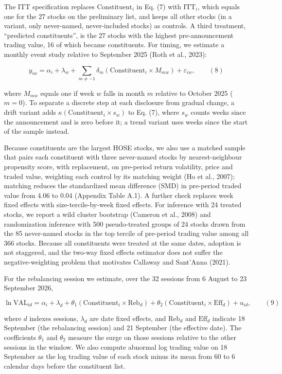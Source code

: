 \documentclass[review,authoryear,12pt]{elsarticle}
\begin{document}
The ITT specification replaces \(\mathrm{Constituent}_i\) in Eq. (7)
with \(\mathrm{ITT}_i\), which equals one for the 27 stocks on the
preliminary list, and keeps all other stocks (in a variant, only
never-named, never-included stocks) as controls. A third treatment,
``predicted constituents'', is the 27 stocks with the highest
pre-announcement trading value, 16 of which became constituents. For
timing, we estimate a monthly event study relative to September 2025
(Roth et al., 2023):

\[y_{iw} = \alpha_i + \lambda_w + \sum_{m \neq -1}\delta_m\left(\mathrm{Constituent}_i \times M_{mw}\right) + \varepsilon_{iw}, \qquad (8)\]

where \(M_{mw}\) equals one if week \(w\) falls in month \(m\) relative
to October 2025 (\(m = 0\)). To separate a discrete step at each
disclosure from gradual change, a drift variant adds
\(\kappa\left(\mathrm{Constituent}_i \times s_w\right)\) to Eq. (7),
where \(s_w\) counts weeks since the announcement and is zero before it;
a trend variant uses weeks since the start of the sample instead.

Because constituents are the largest HOSE stocks, we also use a matched
sample that pairs each constituent with three never-named stocks by
nearest-neighbour propensity score, with replacement, on pre-period
return volatility, price and traded value, weighting each control by its
matching weight (Ho et al., 2007); matching reduces the standardized
mean difference (SMD) in pre-period traded value from 4.06 to 0.04
(Appendix Table A.1). A further check replaces week fixed effects with
size-tercile-by-week fixed effects. For inference with 24 treated
stocks, we report a wild cluster bootstrap (Cameron et al., 2008) and
randomization inference with 500 pseudo-treated groups of 24 stocks
drawn from the 85 never-named stocks in the top tercile of pre-period
trading value among all 366 stocks. Because all constituents were
treated at the same dates, adoption is not staggered, and the two-way
fixed effects estimator does not suffer the negative-weighting problem
that motivates Callaway and Sant'Anna (2021).

For the rebalancing session we estimate, over the 32 sessions from 6
August to 23 September 2026,

\[\ln\mathrm{VAL}_{id} = \alpha_i + \lambda_d + \theta_1\left(\mathrm{Constituent}_i \times \mathrm{Reb}_d\right) + \theta_2\left(\mathrm{Constituent}_i \times \mathrm{Eff}_d\right) + u_{id}, \qquad (9)\]

where \(d\) indexes sessions, \(\lambda_d\) are date fixed effects, and
\(\mathrm{Reb}_d\) and \(\mathrm{Eff}_d\) indicate 18 September (the
rebalancing session) and 21 September (the effective date). The
coefficients \(\theta_1\) and \(\theta_2\) measure the surge on those
sessions relative to the other sessions in the window. We also compute
abnormal log trading value on 18 September as the log trading value of
each stock minus its mean from 60 to 6 calendar days before the
constituent list.
\end{document}
